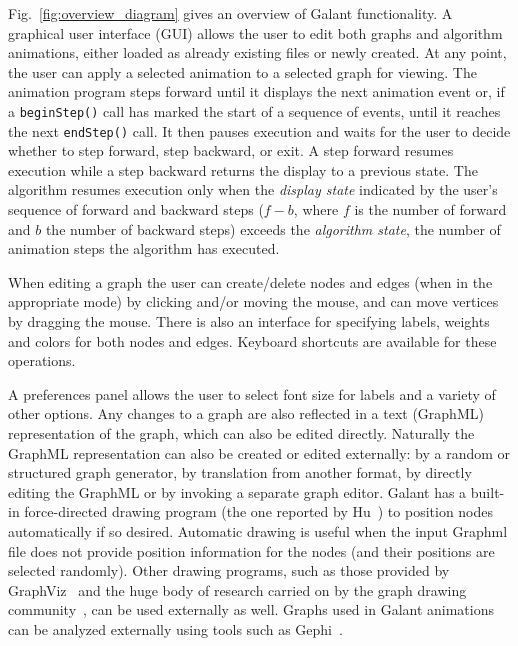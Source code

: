 

Fig.~\ref{fig:overview_diagram} gives an overview of Galant functionality.
A graphical user interface (GUI) allows the user to edit both graphs and
algorithm animations, either loaded as already existing files or newly
created. At any point, the user can apply a selected animation to a selected
graph for viewing.
The animation program 
steps forward until it
displays the next animation event or, if a \texttt{beginStep()}
call has marked the start of a sequence of events, until
it reaches the next \texttt{endStep()} call.
It then pauses execution and waits for the user to decide whether to
step forward, step backward, or exit.
A step forward resumes execution while a step backward returns the display to a previous
state.
The algorithm resumes execution only when the \emph{display state}
indicated by the user's sequence of forward and backward steps
($f-b$, where $f$ is the number of forward and $b$ the number of backward steps)
exceeds the \emph{algorithm state}, the number of animation steps the algorithm
has executed.

When editing a graph the user can create/delete nodes and edges (when in the appropriate mode)
by clicking and/or
moving the mouse, and can move vertices by dragging the mouse.
There is also an interface for specifying labels, weights and colors for both
nodes and edges.
Keyboard shortcuts are available for these operations.
 
A preferences panel allows the user to select font size for labels and a
variety of other options.
Any changes to a graph are also reflected in a text (GraphML) representation
of the graph, which can also be edited directly. Naturally the GraphML
representation can also be created or edited externally: by a random or
structured graph generator, by translation from another format, by directly
editing the GraphML or by invoking a separate graph editor.
Galant has a built-in force-directed drawing program 
(the one reported by Hu~\cite{2006-Mathematica-Hu}) to position nodes
automatically if so desired.
Automatic drawing is useful when the input Graphml file does not provide position
information for the nodes (and their positions are selected randomly).
Other drawing programs, such as those provided by GraphViz~\cite{GraphViz}
and the huge body of research carried on by the graph drawing community~\cite{graph_drawing},
can be used externally as well.
Graphs used in Galant animations
can be analyzed externally using tools such as Gephi~\cite{gephi}.

